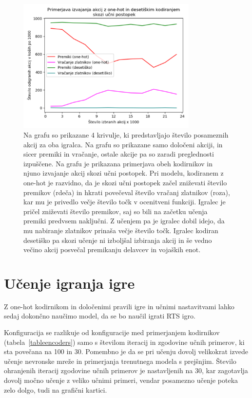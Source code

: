 \documentclass[a4paper, 12pt]{book}
\begin{document}
\begin{figure}[h!]
	\begin{center}
		\includegraphics[width=0.8\textwidth]{photos/onehot_numeric_primerjava_akcij.pdf}
	\end{center}
	\caption{Na grafu so prikazane 4 krivulje, ki predstavljajo število posameznih akcij za oba igralca. Na grafu so prikazane samo določeni akciji, in sicer premiki in vračanje, ostale akcije pa so zaradi preglednosti izpuščene.
		Na grafu je prikazana primerjava obeh kodirnikov in njuno izvajanje akcij skozi učni postopek.
		Pri modelu, kodiranem z one-hot je razvidno, da je skozi učni postopek začel zniževati število premikov (rdeča) in hkrati povečeval število vračanj zlatnikov (roza), kar mu je privedlo večje število točk v ocenitveni funkciji.
		Igralec je pričel zniževati število premikov, saj so bili na začetku učenja premiki predvsem naključni. Z učenjem pa je igralec dobil idejo, da mu nabiranje zlatnikov prinaša večje število točk.
	Igralec kodiran desetiško pa skozi učenje ni izboljšal izbiranja akcij in še vedno večino akcij posvečal premikanju delavcev in vojaških enot. }
	\label{onehotPrimerjavaAkcij}
\end{figure}

\section{Učenje igranja igre}
Z one-hot kodirnikom in določenimi pravili igre in učnimi nastavitvami lahko sedaj dokončno naučimo model, da se bo naučil igrati RTS igro.

Konfiguracija se razlikuje od konfiguracije med primerjanjem kodirnikov (tabela~\ref{tableencoders}) samo s številom iteracij in zgodovine učnih primerov, ki sta povečana na 100 in 30.
Pomembno je da se pri učenju dovolj velikokrat izvede učenje nevronske mreže in primerjanja trenutnega modela s prejšnjim.
Število ohranjenih iteracij zgodovine učnih primerov je nastavljenih na 30, kar zagotavlja dovolj močno učenje z veliko učnimi primeri, vendar posamezno učenje poteka zelo dolgo, tudi na grafični kartici.
\end{document}
